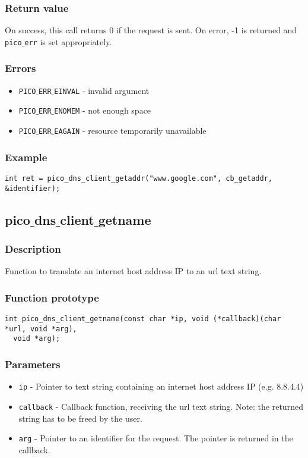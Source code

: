 \subsubsection*{Return value}
On success, this call returns 0 if the request is sent.
On error, -1 is returned and \texttt{pico$\_$err} is set appropriately.

\subsubsection*{Errors}
\begin{itemize}[noitemsep]
\item \texttt{PICO$\_$ERR$\_$EINVAL} - invalid argument
\item \texttt{PICO$\_$ERR$\_$ENOMEM} - not enough space
\item \texttt{PICO$\_$ERR$\_$EAGAIN} - resource temporarily unavailable
\end{itemize}

\subsubsection*{Example}
\begin{verbatim}
int ret = pico_dns_client_getaddr("www.google.com", cb_getaddr, &identifier);
\end{verbatim}



\subsection{pico$\_$dns$\_$client$\_$getname}

\subsubsection*{Description}
Function to translate an internet host address IP to an url text string.

\subsubsection*{Function prototype}
\begin{verbatim}
int pico_dns_client_getname(const char *ip, void (*callback)(char *url, void *arg), 
  void *arg);
\end{verbatim}

\subsubsection*{Parameters}
\begin{itemize}[noitemsep]
\item \texttt{ip} - Pointer to text string containing an internet host address IP (e.g. 8.8.4.4)
\item \texttt{callback} - Callback function, receiving the url text string. Note: the returned string has to be freed by the user.
\item \texttt{arg} - Pointer to an identifier for the request. The pointer is returned in the callback.
\end{itemize}

